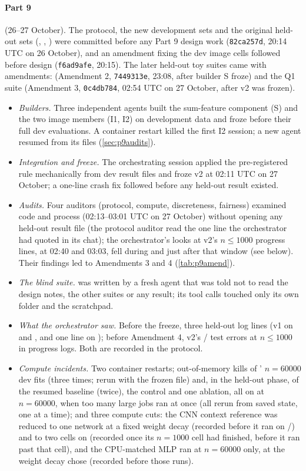 \paragraph{Part 9} (26--27 October). The protocol, the new development sets and the original held-out sets (, , ) were committed before any Part 9 design work (\texttt{82ca257d}, 20:14 UTC on 26 October), and an amendment fixing the dev image cells followed before design (\texttt{f6ad9afe}, 20:15). The later held-out toy suites came with amendments:  (Amendment 2, \texttt{7449313e}, 23:08, after builder S froze) and the Q1 suite  (Amendment 3, \texttt{0c4db784}, 02:54 UTC on 27 October, after v2 was frozen).
\begin{itemize}
\item \emph{Builders.} Three independent agents built the sum-feature component (S) and the two image members (I1, I2) on development data and froze before their full dev evaluations. A container restart killed the first I2 session; a new agent resumed from its files (\cref{sec:p9audits}).
\item \emph{Integration and freeze.} The orchestrating session applied the pre-registered rule mechanically from dev result files and froze v2 at 02:11 UTC on 27 October; a one-line crash fix followed before any held-out result existed.
\item \emph{Audits.} Four auditors (protocol, compute, discreteness, fairness) examined code and process (02:13--03:01 UTC on 27 October) without opening any held-out result file (the protocol auditor read the one   line the orchestrator had quoted in its chat); the orchestrator's looks at v2's $n\le1000$ progress lines, at 02:40 and 03:03, fell during and just after that window (see below). Their findings led to Amendments 3 and 4 (\cref{tab:p9amend}).
\item \emph{The blind suite.}  was written by a fresh agent that was told not to read the design notes, the other suites or any result; its tool calls touched only its own folder and the scratchpad.
\item \emph{What the orchestrator saw.} Before the freeze, three held-out log lines (v1 on  and , and one  line on ); before Amendment 4, v2's / test errors at $n\le1000$ in progress logs. Both are recorded in the protocol.
\item \emph{Compute incidents.} Two container restarts; out-of-memory kills of ' $n=60000$ dev fits (three times; rerun with the frozen file) and, in the held-out phase, of the resumed baseline  (twice), the  control and one  ablation, all on  at $n=60000$, when too many large jobs ran at once (all rerun from saved state, one at a time); and three compute cuts: the CNN context reference was reduced to one network at a fixed weight decay (recorded before it ran on /) and to two cells on  (recorded once its $n=1000$ cell had finished, before it ran past that cell), and the CPU-matched MLP ran at $n=60000$ only, at the weight decay  chose (recorded before those runs).

\end{itemize}
